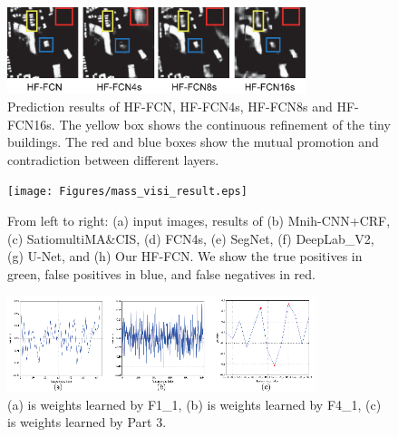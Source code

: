 \begin{figure}
\vspace{-0cm}
\setlength{\abovecaptionskip}{-0cm}  
\setlength{\belowcaptionskip}{-1cm}  
\centering
\includegraphics[width=8.7cm]{Figures/HF-FCN_variants_result.eps}
\caption{Prediction results of HF-FCN, HF-FCN4s, HF-FCN8s and HF-FCN16s. The yellow box shows the continuous refinement of the tiny buildings. The red and blue boxes show the mutual promotion and contradiction between different layers.}
\label{fig:Mass-variants-visi}
\end{figure}

\begin{figure}
\vspace{-0.5cm}
\setlength{\abovecaptionskip}{-0cm}
\setlength{\belowcaptionskip}{-1cm}  
\centering
\texttt{[image: Figures/mass\_visi\_result.eps]}
\caption{From left to right: (a) input images, results of (b) Mnih-CNN+CRF, (c) Satio\-multi\-MA\&CIS, (d) FCN4s, (e) SegNet, (f) DeepLab\_V2, (g) U-Net, and (h) Our HF-FCN. We show the true positives in green, false positives in blue, and false negatives in red.}
\label{fig:Mass-visi-result}
\end{figure}

\begin{figure}
\vspace{-0.4cm}
\setlength{\abovecaptionskip}{-0cm}
\setlength{\belowcaptionskip}{-1cm}  
\centering
\includegraphics[width=9cm]{Figures/weights.eps}
\caption{(a) is weights learned by F1\_1, (b) is weights learned by F4\_1, (c) is weights learned by Part 3.}
\label{fig:Mass-weights}
\end{figure}

